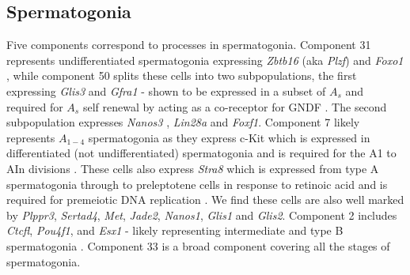 \subsection{Spermatogonia}


Five components correspond to processes in spermatogonia.
Component 31 represents undifferentiated spermatogonia expressing \textit{Zbtb16} (aka \textit{Plzf}) \parencite{Buaas2004Plzf} and \textit{Foxo1} \parencite{Goertz2011Foxo1}, while component 50 splits these cells into two subpopulations, the first expressing \textit{Glis3} \parencite{Kang2016Transcription} and \textit{Gfra1} - shown to be expressed in a subset of $A_s$ and required for $A_s$ self renewal by acting as a co-receptor for GNDF \parencite{Meng2000Regulation,He2007Gfra1}.
The second subpopulation expresses \textit{Nanos3} \parencite{Suzuki2009heterogeneity}, \textit{Lin28a} \parencite{Zheng2009pluripotency} and \textit{Foxf1}.
Component 7 likely represents $A_{1-4}$ spermatogonia as they express c-Kit which is expressed in differentiated (not undifferentiated) spermatogonia \parencite{Manova1990Gonadal,Schrans-Stassen1999Differential} and is required for the A1 to AIn divisions \parencite{Yoshinaga1991Role}.
These cells also express \textit{Stra8} which is expressed from type A spermatogonia through to preleptotene cells in response to retinoic acid \parencite{Oulad-Abdelghani1996Characterization,Zhou2008Expression,Endo2015Periodic} and is required for premeiotic DNA replication \parencite{Baltus2006germ}.
We find these cells are also well marked by \textit{Plppr3}, \textit{Sertad4}, \textit{Met}, \textit{Jade2}, \textit{Nanos1}, \textit{Glis1} and \textit{Glis2}.
Component 2 includes \textit{Ctcfl}, \textit{Pou4f1}, and \textit{Esx1} - likely representing intermediate and type B spermatogonia \parencite{Sleutels2012male, Budhram-Mahadeo2001closely, Maezawa2018Dynamic, Li1997Esx1, Branford1997Spx1}.
Component 33 is a broad component covering all the stages of spermatogonia.


